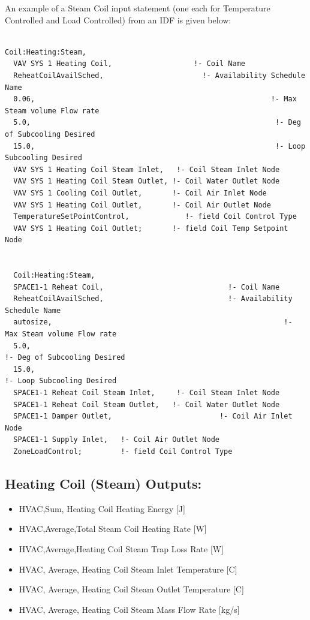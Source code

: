 An example of a Steam Coil input statement (one each for Temperature Controlled and Load Controlled) from an IDF is given below:

\begin{lstlisting}

Coil:Heating:Steam,
  VAV SYS 1 Heating Coil,                   !- Coil Name
  ReheatCoilAvailSched,                       !- Availability Schedule Name
  0.06,                                                       !- Max Steam volume Flow rate
  5.0,                                                         !- Deg of Subcooling Desired
  15.0,                                                        !- Loop Subcooling Desired
  VAV SYS 1 Heating Coil Steam Inlet,   !- Coil Steam Inlet Node
  VAV SYS 1 Heating Coil Steam Outlet, !- Coil Water Outlet Node
  VAV SYS 1 Cooling Coil Outlet,       !- Coil Air Inlet Node
  VAV SYS 1 Heating Coil Outlet,       !- Coil Air Outlet Node
  TemperatureSetPointControl,             !- field Coil Control Type
  VAV SYS 1 Heating Coil Outlet;       !- field Coil Temp Setpoint Node


  Coil:Heating:Steam,
  SPACE1-1 Reheat Coil,                             !- Coil Name
  ReheatCoilAvailSched,                             !- Availability Schedule Name
  autosize,                                                      !- Max Steam volume Flow rate
  5.0,                                                                !- Deg of Subcooling Desired
  15.0,                                                              !- Loop Subcooling Desired
  SPACE1-1 Reheat Coil Steam Inlet,     !- Coil Steam Inlet Node
  SPACE1-1 Reheat Coil Steam Outlet,   !- Coil Water Outlet Node
  SPACE1-1 Damper Outlet,                         !- Coil Air Inlet Node
  SPACE1-1 Supply Inlet,   !- Coil Air Outlet Node
  ZoneLoadControl;         !- field Coil Control Type
\end{lstlisting}

\subsection{Heating Coil (Steam) Outputs:}\label{heating-coil-steam-outputs}

\begin{itemize}
\item
  HVAC,Sum, Heating Coil Heating Energy {[}J{]}
\item
  HVAC,Average,Total Steam Coil Heating Rate {[}W{]}
\item
  HVAC,Average,Heating Coil Steam Trap Loss Rate {[}W{]}
\item
  HVAC, Average, Heating Coil Steam Inlet Temperature {[}C{]}
\item
  HVAC, Average, Heating Coil Steam Outlet Temperature {[}C{]}
\item
  HVAC, Average, Heating Coil Steam Mass Flow Rate {[}kg/s{]}
\end{itemize}

